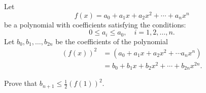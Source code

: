 Let \[f(x) = a_{0}+a_{1}x+a_{2}x^{2}+\cdots+a_{n}x^{n}\] be a polynomial with coefficients satisfying the conditions: \[0\le a_{i}\le a_{0},\quad i=1,2,\ldots,n.\] Let $b_{0},b_{1},\ldots,b_{2n}$ be the coefficients of the polynomial\begin{align*}\left(f(x)\right)^{2}&= \left(a_{0}+a_{1}x+a_{2}x^{2}+\cdots a_{n}x^{n}\right)\\ &= b_{0}+b_{1}x+b_{2}x^{2}+\cdots+b_{2n}x^{2n}. \end{align*}

Prove that $b_{n+1}\le \frac{1}{2}\left(f(1)\right)^{2}$.
